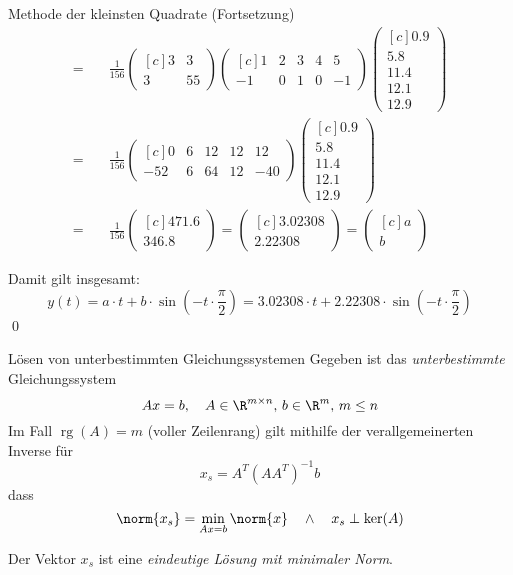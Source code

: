 \documentclass[german]{../spicker}
\newcommand{\vektor}[1]{\begin{pmatrix*}[c] #1 \end{pmatrix*}}
\newcommand{\rg}{\operatorname{rg}}
\begin{document}
\begin{example}{Methode der kleinsten Quadrate (Fortsetzung)}
$$\begin{aligned}
            = \quad           & \frac{1}{156}\vektor{3        & 3                 \\ 3 & 55} \vektor{1 & 2 & 3 & 4 & 5 \\ -1 & 0 & 1 & 0 & -1} \vektor{0.9 \\ 5.8 \\ 11.4 \\ 12.1 \\ 12.9} \\
            = \quad           & \frac{1}{156}\vektor{0        & 6  & 12 & 12 & 12 \\ -52 & 6 & 64 & 12 & -40} \vektor{0.9 \\ 5.8 \\ 11.4 \\ 12.1 \\ 12.9} \\
            = \quad           & \frac{1}{156}\vektor{471.6                        \\ 346.8} = \vektor{3.02308 \\ 2.22308} = \vektor{a \\ b}
        \end{aligned}
    $$

    Damit gilt insgesamt:
    $$
        y(t) = a \cdot t + b \cdot \sin\left( -t \cdot \frac{\pi}{2} \right) = 3.02308 \cdot t + 2.22308 \cdot \sin\left( -t \cdot \frac{\pi}{2} \right)
    $$\qed
\end{example}


\begin{algo}{Lösen von unterbestimmten Gleichungssystemen}
    Gegeben ist das \emph{unterbestimmte} Gleichungssystem
    $$
        Ax = b, \quad A \in \R^{m\times n}, \, b\in \R^m, \, m \leq n
    $$
    Im Fall $\rg(A) = m$ (voller Zeilenrang) gilt mithilfe der verallgemeinerten Inverse für
    $$
        x_s = A^T(AA^T)^{-1}b
    $$
    dass
    $$
        \norm{x_s} = \min_{Ax=b} \norm{x} \quad \land \quad x_s \perp \ker(A)
    $$

    Der Vektor $x_s$ ist eine \emph{eindeutige Lösung mit minimaler Norm}.
\end{algo}
\end{document}
